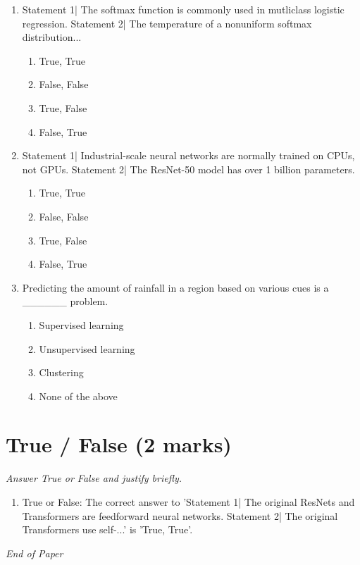 \documentclass[{\csname fa0013Font0\endcsname\char"0033}{\csname fa0014Font0\endcsname\char"0034}pt]{article}
\begin{document}
\begin{enumerate}[label=\arabic*.]
\begin{enumerate}[label=(\alph*)]
    \item The use of weak classifiers
    \item The use of classification algorithms which are not prone to overfitting
    \item The practice of validation performed on every classifier trained
\end{enumerate}
\item Statement 1| The softmax function is commonly used in mutliclass logistic regression. Statement 2| The temperature of a nonuniform softmax distribution...
\begin{enumerate}[label=(\alph*)]
    \item True, True
    \item False, False
    \item True, False
    \item False, True
\end{enumerate}
\item Statement 1| Industrial-scale neural networks are normally trained on CPUs, not GPUs. Statement 2| The ResNet-50 model has over 1 billion parameters.
\begin{enumerate}[label=(\alph*)]
    \item True, True
    \item False, False
    \item True, False
    \item False, True
\end{enumerate}
\item Predicting the amount of rainfall in a region based on various cues is a \_\_\_\_\_\_ problem.
\begin{enumerate}[label=(\alph*)]
    \item Supervised learning
    \item Unsupervised learning
    \item Clustering
    \item None of the above
\end{enumerate}
\end{enumerate}

\section*{True / False (2 marks)}
\textit{Answer True or False and justify briefly.}
\begin{enumerate}[label=\arabic*.]
\item True or False: The correct answer to 'Statement 1| The original ResNets and Transformers are feedforward neural networks. Statement 2| The original Transformers use self-...' is 'True, True'.
\end{enumerate}

\vfill
\noindent\textit{End of Paper}
\end{document}
